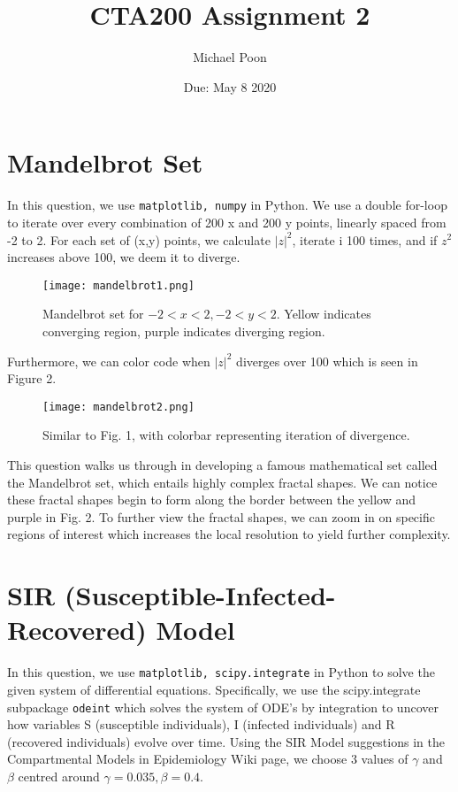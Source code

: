 \documentclass{article}
\title{CTA200 Assignment 2}
\author{Michael Poon}
\date{Due: May 8 2020}
\begin{document}
\maketitle

\section{Mandelbrot Set}

In this question, we use \texttt{matplotlib, numpy} in Python. We use a double for-loop to iterate over every combination of 200 x and 200 y points, linearly spaced from -2 to 2. For each set of (x,y) points, we calculate $|z|^2$, iterate i 100 times, and if $z^2$ increases above 100, we deem it to diverge. 

\begin{figure}[H]
    \centering
    \texttt{[image: mandelbrot1.png]}
    \caption{Mandelbrot set for $-2<x<2,-2<y<2$. Yellow indicates converging region, purple indicates diverging region.}
\end{figure}

Furthermore, we can color code when $|z|^2$ diverges over 100 which is seen in Figure 2.

\begin{figure}[H]
    \centering
    \texttt{[image: mandelbrot2.png]}
    \caption{Similar to Fig. 1, with colorbar representing iteration of divergence. }
\end{figure}

This question walks us through in developing a famous mathematical set called the Mandelbrot set, which entails highly complex fractal shapes. We can notice these fractal shapes begin to form along the border between the yellow and purple in Fig. 2. To further view the fractal shapes, we can zoom in on specific regions of interest which increases the local resolution to yield further complexity.

\section{SIR (Susceptible-Infected-Recovered) Model}

In this question, we use \texttt{matplotlib, scipy.integrate} in Python to solve the given system of differential equations. Specifically, we use the scipy.integrate subpackage \texttt{odeint} which solves the system of ODE's by integration to uncover how variables S (susceptible individuals), I (infected individuals) and R (recovered individuals) evolve over time. Using the SIR Model suggestions in the Compartmental Models in Epidemiology Wiki page, we choose 3 values of $\gamma$ and $\beta$ centred around $\gamma=0.035, \beta=0.4$.
\end{document}
